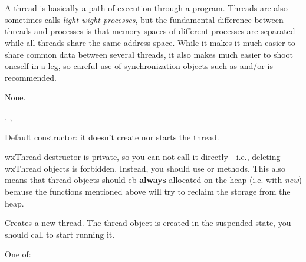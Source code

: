 \section{}\label{wxthread}

A thread is basically a path of execution through a program. Threads are also
sometimes calls {\it light-wight processes}, but the fundamental difference
between threads and processes is that memory spaces of different processes are
separated while all threads share the same address space. While it makes it
much easier to share common data between several threads, it also makes much
easier to shoot oneself in a leg, so careful use of synchronization objects
such as  and/or  is recommended.


None.


, , 


\label{wxthreadctor}


Default constructor: it doesn't create nor starts the thread.



wxThread destructor is private, so you can not call it directly - i.e., deleting
wxThread objects is forbidden. Instead, you should use  or
 methods. This also means that thread objects should
eb {\bf always} allocated on the heap (i.e. with {\it new}) because the functions
mentioned above will try to reclaim the storage from the heap.

\label{wxthreadcreate}


Creates a new thread. The thread object is created in the suspended state, you
should call  to start running it.


One of:

